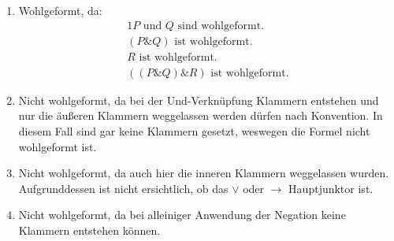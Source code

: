 \documentclass[10pt,a4paper,oneside,ngerman,numbers=noenddot]{scrartcl}
\def\thesection{\arabic{section}.}
\begin{document}
\begin{enumerate}[label=\thesection\arabic*]
    \item Wohlgeformt, da:
    \begin{alignat*}{1}
        P \text{ und } Q \text{ sind wohlgeformt.} \\
        (P \& Q) \text{ ist wohlgeformt.} \\
        R \text{ ist wohlgeformt.} \\
        ((P \& Q) \& R) \text{ ist wohlgeformt.}
    \end{alignat*}
    \item Nicht wohlgeformt, da bei der Und-Verknüpfung Klammern entstehen
    und nur die äußeren Klammern weggelassen werden dürfen nach Konvention.
    In diesem Fall sind gar keine Klammern gesetzt, weswegen die Formel nicht
    wohlgeformt ist.
    \item Nicht wohlgeformt, da auch hier die inneren Klammern weggelassen wurden.
    Aufgrunddessen ist nicht ersichtlich, ob das \(\vee\) oder \(\rightarrow\)
    Hauptjunktor ist.
    \item Nicht wohlgeformt, da bei alleiniger Anwendung der Negation keine
    Klammern entstehen können.
\end{enumerate}
\end{document}
